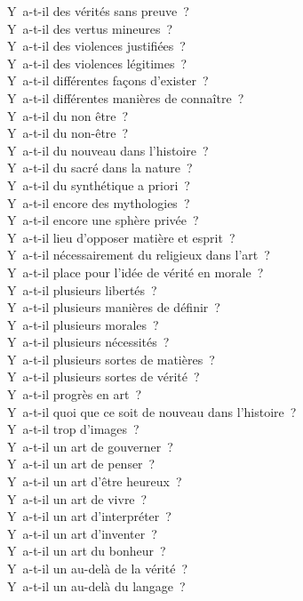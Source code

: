\documentclass[a4paper,12pt]{article}
\begin{document}
Y a-t-il des vérités sans preuve ? \\
Y a-t-il des vertus mineures ? \\
Y a-t-il des violences justifiées ? \\
Y a-t-il des violences légitimes ? \\
Y a-t-il différentes façons d'exister ? \\
Y a-t-il différentes manières de connaître ? \\
Y a-t-il du non être ? \\
Y a-t-il du non-être ? \\
Y a-t-il du nouveau dans l'histoire ? \\
Y a-t-il du sacré dans la nature ? \\
Y a-t-il du synthétique a priori ? \\
Y a-t-il encore des mythologies ? \\
Y a-t-il encore une sphère privée ? \\
Y a-t-il lieu d'opposer matière et esprit ? \\
Y a-t-il nécessairement du religieux dans l'art ? \\
Y a-t-il place pour l'idée de vérité en morale ? \\
Y a-t-il plusieurs libertés ? \\
Y a-t-il plusieurs manières de définir ? \\
Y a-t-il plusieurs morales ? \\
Y a-t-il plusieurs nécessités ? \\
Y a-t-il plusieurs sortes de matières ? \\
Y a-t-il plusieurs sortes de vérité ? \\
Y a-t-il progrès en art ? \\
Y a-t-il quoi que ce soit de nouveau dans l'histoire ? \\
Y a-t-il trop d'images ? \\
Y a-t-il un art de gouverner ? \\
Y a-t-il un art de penser ? \\
Y a-t-il un art d'être heureux ? \\
Y a-t-il un art de vivre ? \\
Y a-t-il un art d'interpréter ? \\
Y a-t-il un art d'inventer ? \\
Y a-t-il un art du bonheur ? \\
Y a-t-il un au-delà de la vérité ? \\
Y a-t-il un au-delà du langage ? \\
\end{document}
